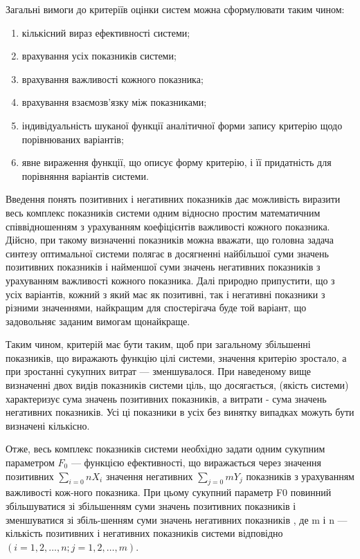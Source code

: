 Загальні вимоги до критеріїв оцінки систем можна сформулювати таким чином:

\begin{enumerate}
\item кількісний вираз ефективності системи;
\item врахування усіх показників системи;
\item врахування важливості кожного показника;
\item врахування взаємозв’язку між показниками;
\item індивідуальність шуканої функції аналітичної форми запису критерію щодо порівнюваних
  варіантів;
\item явне вираження функції, що описує форму критерію, і її придатність для порівняння варіантів
  системи.
\end{enumerate}
   
Введення понять позитивних і негативних показників дає можливість виразити весь комплекс показників
системи одним відносно простим математичним співвідношенням з урахуванням коефіцієнтів важливості
кожного показника. Дійсно, при такому визначенні показників можна вважати, що головна задача синтезу
оптимальної системи полягає в досягненні найбільшої суми значень позитивних показників і найменшої
суми значень негативних показників з урахуванням важливості кожного показника. Далі природно
припустити, що з усіх варіантів, кожний з який має як позитивні, так і негативні показники з різними
значеннями, найкращим для спостерігача буде той варіант, що задовольняє заданим вимогам щонайкраще.

Таким чином, критерій має бути таким, щоб при загальному збільшенні показників, що виражають функцію
цілі системи, значення критерію зростало, а при зростанні сукупних витрат --- зменшувалося. При
наведеному вище визначенні двох видів показників системи ціль, що досягається, (якість системи)
характеризує сума значень позитивних показників, а витрати - сума значень негативних показників. Усі
ці показники в усіх без винятку випадках можуть бути визначені кількісно.

Отже, весь комплекс показників системи необхідно задати одним сукупним параметром $F_0$ --- функцією
ефективності, що виражається через значення позитивних $\displaystyle\sum_{i=0}{n} X_i$ значення
негативних $\displaystyle\sum_{j=0}{m} Y_j$ показників з урахуванням важливості кож-ного
показника. При цьому сукупний параметр F0 повинний збільшуватися зі збільшенням суми значень
позитивних показників і зменшуватися зі збіль-шенням суми значень негативних показників , де m і n
--- кількість позитивних і негативних показників системи відповідно $(i=1,2,\ldots,n;
j=1,2,\ldots,m)$.

